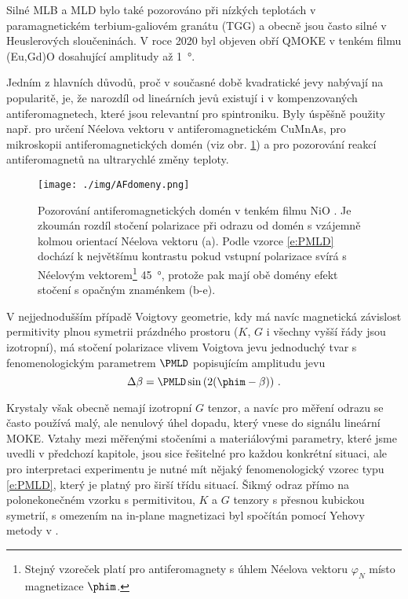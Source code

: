 Silné MLB a MLD bylo také pozorováno při nízkých teplotách v paramagnetickém terbium-galiovém granátu (TGG)\cite{pozor3} a obecně jsou často silné v Heuslerových sloučeninách\cite{Heusler}.
V roce 2020 byl objeven obří QMOKE v tenkém filmu (Eu,Gd)O dosahující amplitudy až \SI{1}{\degree}.

Jedním z hlavních důvodů, proč v současné době kvadratické jevy nabývají na popularitě, je, že narozdíl od lineárních jevů existují i v kompenzovaných antiferomagnetech, které jsou relevantní pro spintroniku\cite{Jungwirthantifero}\cite{Nemecantifero}.
Byly úspěšně použity např. pro určení Néelova vektoru v antiferomagnetickém CuMnAs\cite{SaidlOpticalNeel}, pro mikroskopii antiferomagnetických domén\cite{antifdomeny} (viz obr. \ref{f:AFdomeny}) a pro pozorování reakcí antiferomagnetů na ultrarychlé změny teploty\cite{antifteploty}.

\begin{figure}
    \centering
    \texttt{[image: ./img/AFdomeny.png]}
    \caption{Pozorování antiferomagnetických domén v tenkém filmu NiO \cite{antifdomeny}. Je zkoumán rozdíl stočení polarizace při odrazu od domén s vzájemně kolmou orientací Néelova vektoru (a). Podle vzorce \eqref{e:PMLD} dochází k největšímu kontrastu pokud vstupní polarizace svírá s Néelovým vektorem\footnote{Stejný vzoreček platí pro antiferomagnety s úhlem Néelova vektoru $\varphi_N$ místo magnetizace $\phim$.} \SI{45}{\degree}, protože pak mají obě domény efekt stočení s opačným znaménkem (b-e).}
    \label{f:AFdomeny}
\end{figure}

V nejjednodušším případě Voigtovy geometrie, kdy má navíc magnetická závislost permitivity plnou symetrii prázdného prostoru ($K$, $G$ i všechny vyšší řády jsou izotropní), má stočení polarizace vlivem Voigtova jevu jednoduchý tvar s fenomenologickým parametrem $\PMLD$ popisujícím amplitudu jevu
\begin{equation} \label{e:PMLD}
\Delta \beta=\PMLD \sin\left(2(\phim-\beta)\right) \,.
\end{equation}

Krystaly však obecně nemají izotropní $G$ tenzor, a navíc pro měření odrazu se často používá malý, ale nenulový úhel dopadu, který vnese do signálu lineární MOKE.
Vztahy mezi měřenými stočeními a materiálovými parametry, které jsme uvedli v předchozí kapitole, jsou sice řešitelné pro každou konkrétní situaci, ale pro interpretaci experimentu je nutné mít nějaký fenomenologický vzorec typu \eqref{e:PMLD}, který je platný pro širší třídu situací.
Šikmý odraz přímo na polonekonečném vzorku s permitivitou, $K$ a $G$ tenzory s přesnou kubickou symetrií, s omezením na in-plane magnetizaci byl spočítán pomocí Yehovy metody v \cite{osmismerna}.

